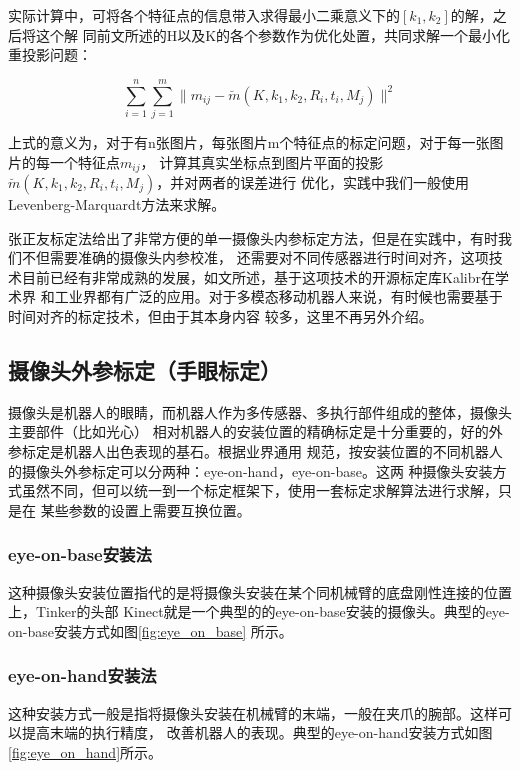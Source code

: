实际计算中，可将各个特征点的信息带入求得最小二乘意义下的$[k_1, k_2]$的解，之后将这个解
同前文所述的H以及K的各个参数作为优化处置，共同求解一个最小化重投影问题：

\begin{equation}
	\sum_{i=1}^{n}\sum_{j=1}^{m} \| m_{ij} - \breve{m}(K, k_1, k_2, R_i, t_i, M_j)\|^2
\end{equation}

上式的意义为，对于有n张图片，每张图片m个特征点的标定问题，对于每一张图片的每一个特征点$m_{ij}$，
计算其真实坐标点到图片平面的投影$\breve{m}(K, k_1, k_2, R_i, t_i, M_j)$，并对两者的误差进行
优化，实践中我们一般使用Levenberg-Marquardt方法来求解。

张正友标定法给出了非常方便的单一摄像头内参标定方法，但是在实践中，有时我们不但需要准确的摄像头内参校准，
还需要对不同传感器进行时间对齐，这项技术目前已经有非常成熟的发展，如文\cite{furgale2013unified, furgale2012continuous}所述，基于这项技术的开源标定库Kalibr\cite{rehder2016extending}在学术界
和工业界都有广泛的应用。对于多模态移动机器人来说，有时候也需要基于时间对齐的标定技术，但由于其本身内容
较多，这里不再另外介绍。

\subsection{摄像头外参标定（手眼标定）}

摄像头是机器人的眼睛，而机器人作为多传感器、多执行部件组成的整体，摄像头主要部件（比如光心）
相对机器人的安装位置的精确标定是十分重要的，好的外参标定是机器人出色表现的基石。根据业界通用
规范，按安装位置的不同机器人的摄像头外参标定可以分两种：eye-on-hand，eye-on-base。这两
种摄像头安装方式虽然不同，但可以统一到一个标定框架下，使用一套标定求解算法进行求解，只是在
某些参数的设置上需要互换位置。

\subsubsection{eye-on-base安装法}

这种摄像头安装位置指代的是将摄像头安装在某个同机械臂的底盘刚性连接的位置上，Tinker的头部
Kinect就是一个典型的的eye-on-base安装的摄像头。典型的eye-on-base安装方式如图\ref{fig:eye_on_base}
所示。

\subsubsection{eye-on-hand安装法}

这种安装方式一般是指将摄像头安装在机械臂的末端，一般在夹爪的腕部。这样可以提高末端的执行精度，
改善机器人的表现。典型的eye-on-hand安装方式如图\ref{fig:eye_on_hand}所示。

